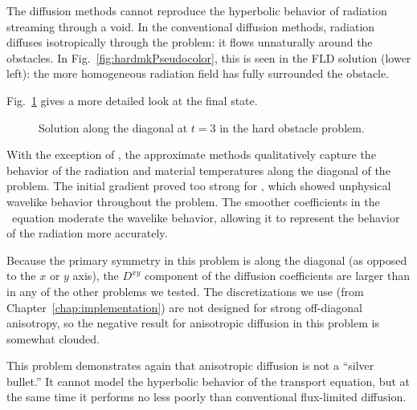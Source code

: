 The diffusion methods cannot reproduce the hyperbolic behavior of radiation
streaming through a void. In the conventional diffusion methods, radiation
diffuses isotropically through the problem: it flows unnaturally around the
obstacles. In Fig.~\ref{fig:hardmkPseudocolor}, this is seen in the FLD solution
(lower left): the more homogeneous radiation field has fully surrounded the
obstacle.

Fig.~\ref{fig:hardmkDiag} gives a more detailed look at the final state.
%
\begin{figure}[htb]
  \centering
  \caption{Solution along the diagonal at $t=3$ in the hard obstacle problem.}
  \label{fig:hardmkDiag}
\end{figure}
%
With the exception of \Pone, the approximate methods qualitatively
capture the behavior of the radiation and material temperatures along the
diagonal of the problem. The initial gradient proved too strong for \Pone, which
showed unphysical wavelike behavior throughout the problem. The smoother
coefficients in the \APone\ equation moderate the wavelike behavior, allowing it
to represent the behavior of the radiation more accurately.

Because the primary symmetry in this problem is along the diagonal (as opposed
to the $x$ or $y$ axis), the $D^{xy}$ component of the diffusion coefficients
are larger than in any of the other problems we tested. The
discretizations we use (from Chapter~\ref{chap:implementation}) are not designed
for strong off-diagonal anisotropy, so the negative result for anisotropic
diffusion in this problem is somewhat clouded.

This problem demonstrates again that anisotropic diffusion is not a ``silver
bullet.'' It cannot model the hyperbolic behavior of the transport equation,
but at the same time it performs no less poorly than conventional flux-limited
diffusion.

%  

